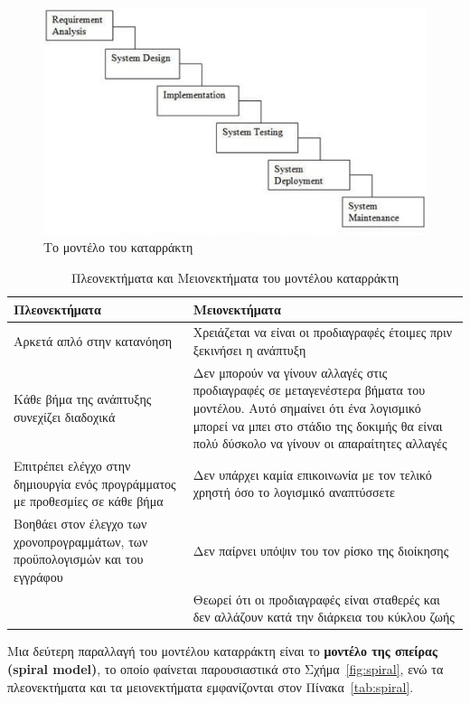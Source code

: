 \begin{figure}[H]
  \centering
  \includegraphics{Figures/waterfall.jpg}
  \caption[Το μοντέλο του καταρράκτη]{Το μοντέλο του καταρράκτη}
  \label{fig:waterfall}
\end{figure}

\begin{table}[H]
  \centering
  \begin{tabular}{| p{8cm} | p{8cm} |}
    \hline
    \textbf{Πλεονεκτήματα} & \textbf{Μειονεκτήματα} \\
    \hline
    Αρκετά απλό στην κατανόηση & Χρειάζεται να είναι οι προδιαγραφές έτοιμες πριν ξεκινήσει η ανάπτυξη \\
    \hline
    Κάθε βήμα της ανάπτυξης συνεχίζει διαδοχικά & Δεν μπορούν να γίνουν αλλαγές στις προδιαγραφές σε μεταγενέστερα βήματα του μοντέλου. Αυτό σημαίνει ότι ένα λογισμικό μπορεί να μπει στο στάδιο της δοκιμής θα είναι πολύ δύσκολο να γίνουν οι απαραίτητες αλλαγές \\
    \hline
    Επιτρέπει ελέγχο στην δημιουργία ενός προγράμματος με προθεσμίες σε κάθε βήμα & Δεν υπάρχει καμία επικοινωνία με τον τελικό χρηστή όσο το λογισμικό αναπτύσσετε \\
    \hline
    Βοηθάει στον έλεγχο των χρονοπρογραμμάτων, των προϋπολογισμών  και του εγγράφου & Δεν παίρνει υπόψιν του τον ρίσκο της διοίκησης \\
    \hline
    & Θεωρεί ότι οι προδιαγραφές είναι σταθερές και δεν αλλάζουν κατά την διάρκεια του κύκλου ζωής  \\
    \hline
  \end{tabular}
  \caption{Πλεονεκτήματα και Μειονεκτήματα του μοντέλου καταρράκτη}
  \label{tab:waterfall_2}
\end{table}

Μια δεύτερη παραλλαγή του μοντέλου καταρράκτη είναι το \textbf{μοντέλο της σπείρας (spiral model)}, το οποίο φαίνεται παρουσιαστικά στο Σχήμα~\ref{fig:spiral}, ενώ τα πλεονεκτήματα και τα μειονεκτήματα εμφανίζονται στον Πίνακα~\ref{tab:spiral}.

